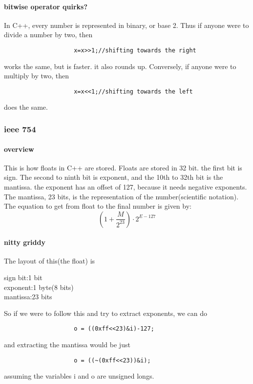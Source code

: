 \documentclass{article} %
\begin{document}
            \paragraph{bitwise operator quirks?}
                In C++, every number is represented in binary, or base 2. Thus if anyone were to divide a number by two, then
                \begin{verbatim}
                    x=x>>1;//shifting towards the right
                \end{verbatim}
                works the same, but is faster. it also rounds up. Conversely, if anyone were to multiply by two, then 
                \begin{verbatim}
                    x=x<<1;//shifting towards the left
                \end{verbatim}
                does the same.
        \subsubsection{ieee 754}
            \paragraph{overview}
                This is how floats in C++ are stored. Floats are stored in 32 bit. the first bit is sign.
                The second to ninth bit is exponent, and the 10th to 32th bit is the mantissa. the exponent has
                an offset of 127, because it needs negative exponents. The mantissa, 23 bits, is the representation of the number(scientific notation).
                The equation to get from float to the final number is given by:
                \begin{equation}
                    (1+\dfrac{M}{2^{23}})\cdot2^{E-127}
                \end{equation}
            \paragraph{nitty griddy}
                The layout of this(the float) is 
                \begin{center}
                    sign bit:1 bit\\
                    exponent:1 byte(8 bits)\\
                    mantissa:23 bits\\
                \end{center}
                So if we were to follow this and try to extract exponents, we can do
                \begin{verbatim}
                    o = ((0xff<<23)&i)-127;
                \end{verbatim}
                and extracting the mantissa would be just 
                \begin{verbatim}
                    o = ((~(0xff<<23))&i);
                \end{verbatim}
                assuming the variables i and o are unsigned longs.
\end{document}
